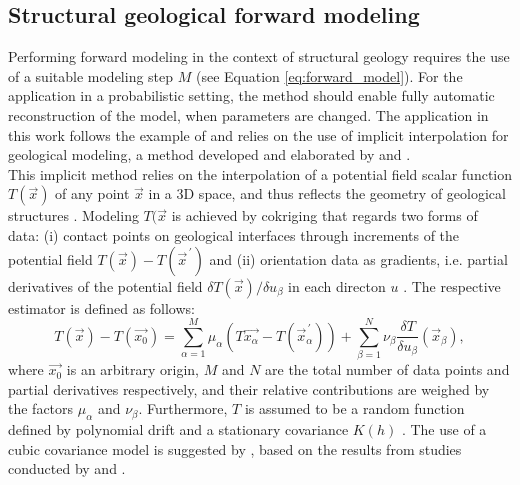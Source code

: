         \subsection{Structural geological forward modeling}\label{sec:struc_geo_modeling}       
        Performing forward modeling in the context of structural geology requires the use of a suitable modeling step $M$ (see Equation \ref{eq:forward_model}). For the application in a probabilistic setting, the method should enable fully automatic reconstruction of the model, when parameters are changed. The application in this work follows the example of \citet{delaVarga2016} and relies on the use of implicit interpolation for geological modeling, a method developed and elaborated by \citet{Lajaunie1997} and \citet{calcagno2008geological}.\\
        This implicit method relies on the interpolation of a potential field scalar function $T(\vec{x})$ of any point $\vec{x}$ in a 3D space, and thus reflects the geometry of geological structures \citep{calcagno2008geological}. Modeling $T(\vec{x}$ is achieved by cokriging that regards two forms of data: (i) contact points on geological interfaces through increments of the potential field $T(\vec{x})-T(\vec{x}^{\,'})$ and (ii) orientation data as gradients, i.e. partial derivatives of the potential field $\delta T(\vec{x})/\delta u_\beta$ in each directon $u$ \citep{calcagno2008geological}. The respective estimator is defined as follows:
        \begin{equation}\label{eq:Cokriging_Estimator}
                T(\vec{x})-T(\vec{x_0})=\sum_{\alpha=1}^{M}\mu_\alpha(T\vec{x_\alpha}-T(\vec{x}^{\,'}_\alpha))+\sum_{\beta=1}^{N}\nu_\beta\frac{\delta T}{\delta u_\beta}(\vec{x}_\beta),
        \end{equation}        
        where $\vec{x_0}$ is an arbitrary origin, $M$ and $N$ are the total number of data points and partial derivatives respectively, and their relative contributions are weighed by the factors $\mu_\alpha$ and $\nu_\beta$. Furthermore, $T$ is assumed to be a random function defined by polynomial drift and a stationary covariance $K(h)$ \citep{calcagno2008geological}. The use of a cubic covariance model is suggested by \citet{calcagno2008geological}, based on the results from studies conducted by \citet{aug2004modelisation} and \citet{chiles2004modelling}.\\
